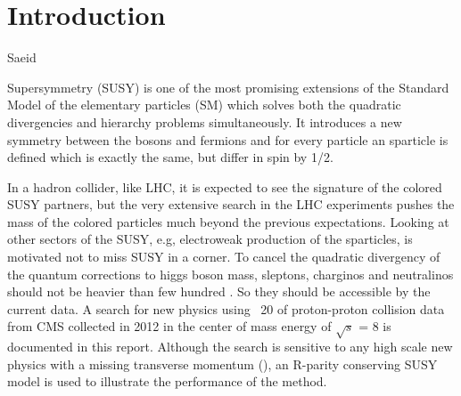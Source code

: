 \section{Introduction}
\label{sect:introduction}

Saeid

Supersymmetry \cite{Martin:1997ns} (SUSY) is one of the most promising extensions of the 
Standard Model of the elementary particles (SM) which solves both the 
quadratic divergencies and hierarchy problems simultaneously. It introduces a new symmetry between the bosons and fermions and 
for every particle an sparticle is defined which is exactly the same, but differ in spin by 1/2. 

In a hadron collider, like LHC, it is expected to see the signature of the colored SUSY partners, 
but the very extensive search in the LHC experiments pushes the mass of the colored particles much 
beyond the previous expectations. 
Looking at other sectors of the SUSY, e.g, electroweak production of the sparticles, is motivated not to miss SUSY in a corner. 
To cancel the quadratic divergency of the quantum corrections to higgs boson mass,  sleptons, charginos and neutralinos 
should not be heavier than few hundred \GeV \cite{1988NuPhB.306...63B, deCarlos:1993yy}. So they should be accessible by the current data.
A search for new physics using ~20 \fbinv of proton-proton collision data from CMS collected in 2012 in the center of mass energy of 
$\sqrt{s}$ = 8 \TeV  is documented in this report. 
Although the search is sensitive to any high scale new physics with a missing transverse momentum (\MET), 
an R-parity conserving SUSY model is used to illustrate the performance of the method.

